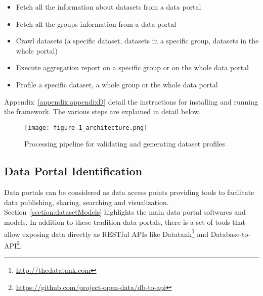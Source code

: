 \begin{itemize}
	\item Fetch all the information about datasets from a data portal
	\item Fetch all the groups information from a data portal
	\item Crawl datasets (a specific dataset, datasets in a specific group, 	datasets in the whole portal)
	\item Execute aggregation report on a specific group or on the whole data portal
	\item Profile a specific dataset, a whole group or the whole data portal
\end{itemize}

Appendix~\ref{appendix:appendixD} detail the instructions for installing and running the framework. The various steps are explained in detail below.

\begin{figure}[!ht]
  \centering
  \texttt{[image: figure-1\_architecture.png]}
  \caption{Processing pipeline for validating and generating dataset profiles}
  \label{fig:Roomba_architecture}
\end{figure}

\subsection{Data Portal Identification}
Data portals can be considered as data access points providing tools to facilitate data publishing, sharing, searching and visualization. Section~\ref{section:datasetModels} highlights the main data portal softwares and models. In addition to these tradition data portals, there is a set of tools that allow exposing data directly as RESTful APIs like Datatank\footnote{\url{http://thedatatank.com}} and Database-to-API\footnote{\url{https://github.com/project-open-data/db-to-api}}.

